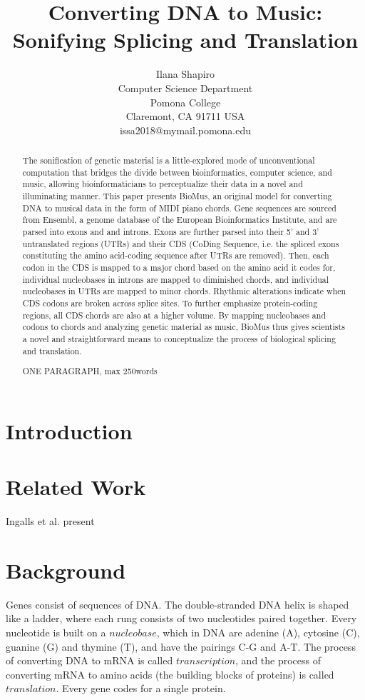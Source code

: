 \documentclass[letterpaper]{article}
\title{Converting DNA to Music: Sonifying Splicing and Translation}
\author{Ilana Shapiro\\
Computer Science Department\\
Pomona College\\
Claremont, CA 91711 USA\\
issa2018@mymail.pomona.edu\\
}
\begin{document}
 
\maketitle
\begin{abstract}
The sonification of genetic material is a little-explored mode of unconventional computation that bridges the divide between bioinformatics, computer science, and music, allowing bioinformaticians to perceptualize their data in a novel and illuminating manner. This paper presents BioMus, an original model for converting DNA to musical data in the form of MIDI piano chords. Gene sequences are sourced from Ensembl, a genome database of the European Bioinformatics Institute, and are parsed into exons and and introns. Exons are further parsed into their 5' and 3' untranslated regions (UTRs) and their CDS (CoDing Sequence, i.e. the spliced exons constituting the amino acid-coding sequence after UTRs are removed). Then, each codon in the CDS is mapped to a major chord based on the amino acid it codes for, individual nucleobases in introns are mapped to diminished chords, and individual nucleobases in UTRs are mapped to minor chords. Rhythmic alterations indicate when CDS codons are broken across splice sites. To further emphasize protein-coding regions, all CDS chords are also at a higher volume. By mapping nucleobases and codons to chords and analyzing genetic material as music, BioMus thus gives scientists a novel and straightforward means to conceptualize the process of biological splicing and translation.

ONE PARAGRAPH, max 250words
\end{abstract}

\section{Introduction}

\section{Related Work}

Ingalls et al. present 

\section{Background}
Genes consist of sequences of DNA. The double-stranded DNA helix is shaped like a ladder, where each rung consists of two nucleotides paired together. Every nucleotide is built on a $nucleobase$, which in DNA are adenine (A), cytosine (C), guanine (G) and thymine (T), and have the pairings C-G and A-T. The process of converting DNA to mRNA is called $transcription$, and the process of converting mRNA to amino acids (the building blocks of proteins) is called $translation$. Every gene codes for a single protein.
\end{document}
